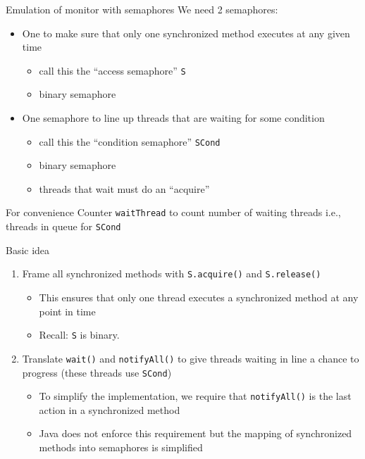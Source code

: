 \begin{frame}{Emulation of monitor with semaphores}
  We need 2 semaphores:
  \begin{itemize}
  \item	One to make sure that only one synchronized method executes at any given time
    \begin{itemize}
    \item call this the ``access semaphore'' \lstinline!S!
    \item binary semaphore
    \end{itemize}
  \item One semaphore to line up threads that are waiting for some condition
    \begin{itemize}
    \item call this the ``condition semaphore'' \lstinline!SCond!
    \item binary semaphore
    \item threads that wait must do an ``acquire''
    \end{itemize}
  \end{itemize}


  \begin{block}{For convenience}
    Counter \lstinline!waitThread! to count number of waiting threads
    i.e., threads in queue for \lstinline!SCond!
  \end{block}
\end{frame}

\begin{frame}{Basic idea}
  \begin{enumerate}
  \item Frame all synchronized methods with \lstinline!S.acquire()! and
    \lstinline!S.release()!
    \begin{itemize}
    \item This ensures that only one thread executes a synchronized
      method at any point in time
    \item Recall: \lstinline!S! is binary.
    \end{itemize}
  \item Translate \lstinline!wait()! and \lstinline!notifyAll()! to give threads waiting in
    line a chance to progress (these threads use \lstinline!SCond!)
    \begin{itemize}
    \item To simplify the implementation, we require that
      \lstinline!notifyAll()! is the last action in a synchronized
      method
    \item Java does not enforce this requirement but the mapping of
      synchronized methods into semaphores is simplified
    \end{itemize}
  \end{enumerate}
\end{frame}

